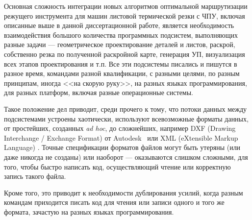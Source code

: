 
Основная сложность интеграции
новых алгоритмов оптимальной маршрутизации
режущего инструмента для машин листовой
термической резки с ЧПУ,
включая описанные выше в данной
диссертационной работе,
является необходимость взаимодействия
большого количества программных подсистем,
выполняющих разные задачи ---
геометрическое проектирование деталей и листов,
раскрой,
собственно резка по полученной раскройной карте,
генерация УП,
визуализация всех этапов проектирования и т.п.
Все эти подсистемы писались и пишутся в разное время,
командами разной квалификации,
с разными целями,
по разным принципам,
иногда <<на скорую руку>>,
на разных языках программирования,
для разных платформ, включая разные операционные системы.

Такое положение дел приводит,
среди прочего к тому,
что потоки данных между подсистемами устроены хаотически,
используют всевозможные форматы данных,
от простейших, созданных \textit{ad hoc},
до сложнейших,
например DXF
(Drawing Interchange / Exchange  Format)
от Autodesk~\cite{bi:DXF}
или XML
(eXtensible Markup Language)
\cite{bi:XML}.
Точные спецификации форматов файлов
могут быть утеряны
(или даже никогда не созданы)
или наоборот ---
оказываются слишком сложными,
для того, чтобы быстро написать код,
осуществляющий чтение или корректную запись такого файла.

Кроме того,
это приводит к необходимости
дублирования усилий,
когда разным командам приходится
писать код для чтения или записи
одного и того же формата,
зачастую на разных языках программирования.
